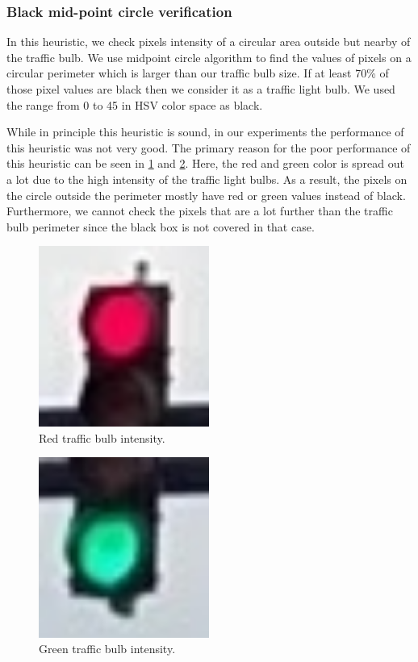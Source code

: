 \subsubsection{Black mid-point circle verification}
In this heuristic, we check pixels intensity of a circular area outside but nearby of the traffic bulb.
We use midpoint circle algorithm to find the values of pixels on a circular perimeter which is larger than our traffic bulb size.
If at least 70\% of those pixel values are black then we consider it as a traffic light bulb.
We used the range from 0 to 45 in HSV color space as black.

While in principle this heuristic is sound, in our experiments the performance of this heuristic was not very good. 
The primary reason for the poor performance of this heuristic can be seen in \ref{f:red_bulb} and \ref{f:green_bulb}.
Here, the red and green color is spread out a lot due to the high intensity of the traffic light bulbs. 
As a result, the pixels on the circle outside the perimeter mostly have red or green values instead of black.
Furthermore, we cannot check the pixels that are a lot further than the traffic bulb perimeter since the black box is not covered in that case.


\begin{figure}[!ht]
  \centering
  \includegraphics[width=2.2in]{images/redlight.jpg}
  \caption{Red traffic bulb intensity.}
  \label{f:red_bulb}
\end{figure}

\begin{figure}[!ht]
  \centering
  \includegraphics[width=2.2in]{images/greenlight.jpg}
  \caption{Green traffic bulb intensity.}
  \label{f:green_bulb}
\end{figure}


